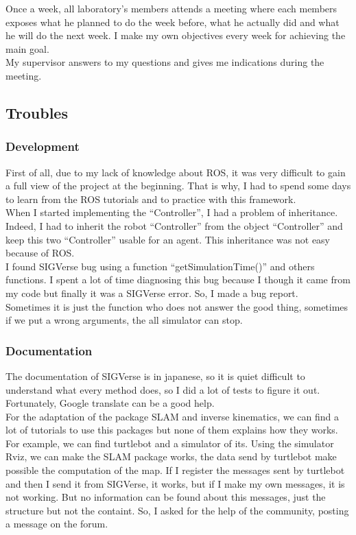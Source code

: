 Once a week, all laboratory's members attends a meeting where each members exposes what he planned to do the week before, what he actually did and what he will do the next week. I make my own objectives every week for achieving the main goal.\\
My supervisor answers to my questions and gives me indications during the meeting.

\subsection{Troubles}
\subsubsection{Development}
First of all, due to my lack of knowledge about ROS, it was very difficult to gain a full view of the project at the beginning. That is why, I had to spend some days to learn from the ROS tutorials and to practice with this framework.\\
When I started implementing the ``Controller'', I had a problem of inheritance. Indeed, I had to inherit the robot ``Controller'' from the object ``Controller'' and keep this two ``Controller'' usable for an agent. This inheritance was not easy because of ROS.\\
I found SIGVerse bug using a function ``getSimulationTime()'' and others functions. I spent a lot of time diagnosing this bug because I though it came from my code but finally it was a SIGVerse error. So, I made a bug report.\\
Sometimes it is just the function who does not answer the good thing, sometimes if we put a wrong arguments, the all simulator can stop.

\subsubsection{Documentation}
The documentation of SIGVerse is in japanese, so it is quiet difficult to understand what every method does, so I did a lot of tests to figure it out. Fortunately, Google translate can be a good help.\\

For the adaptation of the package SLAM and inverse kinematics, we can find a lot of tutorials to use this packages but none of them explains how they works.\\
For example, we can find turtlebot and a simulator of its. Using the simulator Rviz, we can make the SLAM package works, the data send by turtlebot make possible the computation of the map. If I register the messages sent by turtlebot and then I send it from SIGVerse, it works, but if I make my own messages, it is not working. But no information can be found about this messages, just the structure but not the containt. So, I asked for the help of the community, posting a message on the forum.\\

